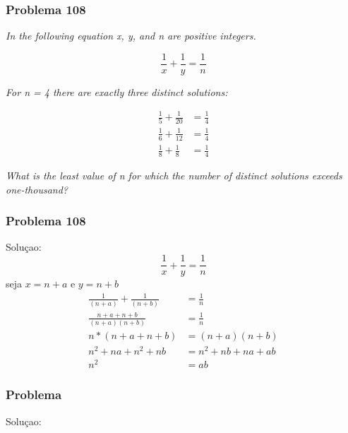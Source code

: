 \documentclass{beamer}
\begin{document}
\begin{frame}
    \frametitle{Problema 108}

    \begin{center}
        \textit{
            In the following equation x, y, and n are positive integers.
        }
    \end{center}

    \begin{equation}
        \frac{1}{x} + \frac{1}{y} = \frac{1}{n}
    \end{equation}

    \begin{center}
        \textit{
            For n = 4 there are exactly three distinct solutions:
        }
    \end{center}

    \begin{align}
        \frac{1}{5} + \frac{1}{20} & = \frac{1}{4} \\
        \frac{1}{6} + \frac{1}{12} & = \frac{1}{4} \\
        \frac{1}{8} + \frac{1}{8}  & = \frac{1}{4}
    \end{align}

    \begin{center}
        \textit{
            What is the least value of n for which the number of distinct solutions exceeds one-thousand?
        }
    \end{center}
\end{frame}

\begin{frame}
    \frametitle{Problema 108}

    Soluçao:
    \begin{equation}
        \frac{1}{x} + \frac{1}{y} = \frac{1}{n}
    \end{equation}
    seja $x=n+a$ e $y=n+b$
    \begin{align}
        \frac{1}{(n+a)} + \frac{1}{(n+b)} & = \frac{1}{n}        \\
        \frac{n+a + n+b}{(n+a)(n+b)}      & = \frac{1}{n}        \\
        n*(n+a+n+b)                       & = (n+a)(n+b)         \\
        n^2 + na + n^2 + nb               & = n^2 + nb + na + ab \\
        n^2                               & = ab
    \end{align}
\end{frame}

\begin{frame}
    \frametitle{Problema}

    \begin{center}
        \textit{
        }
    \end{center}

    Soluçao:
    \begin{center}
    \end{center}
\end{frame}
\end{document}
